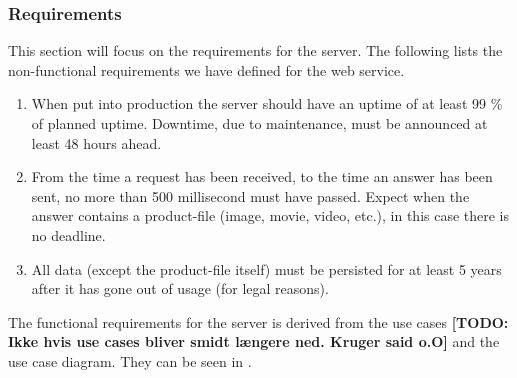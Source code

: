 \subsubsection{Requirements}
\label{s_serviceRequirements}
This section will focus on the requirements for the server. The following lists the non-functional requirements we have defined for the web service.

\begin{enumerate}[label=NFR-\arabic*]
	\item When put into production the server should have an uptime of at least 99 \% of planned uptime. Downtime, due to maintenance, must be announced at least 48 hours ahead.
	
	\item From the time a request has been received, to the time an answer has been sent, no more than 500 millisecond must have passed. Expect when the answer contains a product-file (image, movie, video, etc.), in this case there is no deadline.
	
	\item All data (except the product-file itself) must be persisted for at least 5 years after it has gone out of usage (for legal reasons).
\end{enumerate}

The functional requirements for the server is derived from the use cases \textbf{[TODO: Ikke hvis use cases bliver smidt længere ned. Kruger said o.O]} and the use case diagram. They can be seen in .



